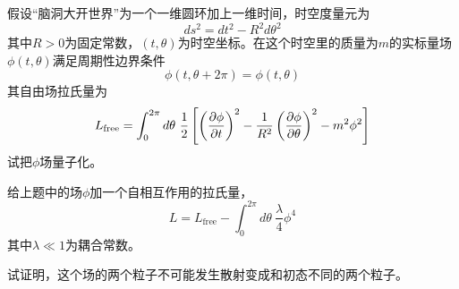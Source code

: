 \documentclass[CJK]{beamer}
\begin{document}
\begin{frame}
\bch
假设“脑洞大开世界”为一个一维圆环加上一维时间，时空度量元为
$$ds^2 = dt^2 - R^2 d\theta^2$$
其中$R>0$为固定常数，$(t,\theta)$为时空坐标。在这个时空里的质量为$m$的实标量场$\phi(t,\theta)$满足周期性边界条件
$$\phi(t,\theta+2\pi) = \phi(t,\theta)$$
其自由场拉氏量为
$$L_{\rm free} = \int_0^{2\pi}d\theta\ \frac{1}{2}\left[\left(\frac{\partial\phi}{\partial t}\right)^2-\frac{1}{R^2}\left(\frac{\partial\phi}{\partial\theta}\right)^2-m^2\phi^2\right]$$
试把$\phi$场量子化。

\ech
\end{frame}


\begin{frame}
\bch
给上题中的场$\phi$加一个自相互作用的拉氏量，
$$L = L_{\mathrm{free}} - \int_0^{2\pi}d\theta\ \frac{\lambda}{4}\phi^4$$
其中$\lambda\ll 1$为耦合常数。

试证明，这个场的两个粒子不可能发生散射变成和初态不同的两个粒子。

\ech
\end{frame}
\end{document}
